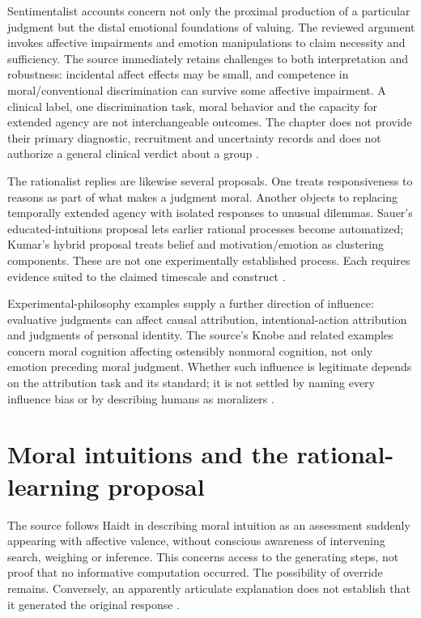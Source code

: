 Sentimentalist accounts concern not only the proximal production of a
particular judgment but the distal emotional foundations of valuing.
The reviewed argument invokes affective impairments and emotion
manipulations to claim necessity and sufficiency. The source immediately
retains challenges to both interpretation and robustness: incidental
affect effects may be small, and competence in moral/conventional
discrimination can survive some affective impairment. A clinical label,
one discrimination task, moral behavior and the capacity for extended
agency are not interchangeable outcomes. The chapter does not provide
their primary diagnostic, recruitment and uncertainty records and does
not authorize a general clinical verdict about a group
\parencite[pp.~704--705]{WiegmannSauer2021MoralJudgment}.

The rationalist replies are likewise several proposals. One treats
responsiveness to reasons as part of what makes a judgment moral. Another
objects to replacing temporally extended agency with isolated responses
to unusual dilemmas. Sauer's educated-intuitions proposal lets earlier
rational processes become automatized; Kumar's hybrid proposal treats
belief and motivation/emotion as clustering components. These are not
one experimentally established process. Each requires evidence suited
to the claimed timescale and construct
\parencite[p.~705]{WiegmannSauer2021MoralJudgment}.

Experimental-philosophy examples supply a further direction of influence:
evaluative judgments can affect causal attribution, intentional-action
attribution and judgments of personal identity. The source's Knobe and
related examples concern moral cognition affecting ostensibly nonmoral
cognition, not only emotion preceding moral judgment. Whether such
influence is legitimate depends on the attribution task and its standard;
it is not settled by naming every influence bias or by describing humans
as moralizers \parencite[p.~705]{WiegmannSauer2021MoralJudgment}.

\section{Moral intuitions and the rational-learning proposal}
\label{sec:p11-r123-learning}

The source follows Haidt in describing moral intuition as an assessment
suddenly appearing with affective valence, without conscious awareness
of intervening search, weighing or inference. This concerns access to
the generating steps, not proof that no informative computation occurred.
The possibility of override remains. Conversely, an apparently articulate
explanation does not establish that it generated the original response
\parencite[p.~705]{WiegmannSauer2021MoralJudgment}.

